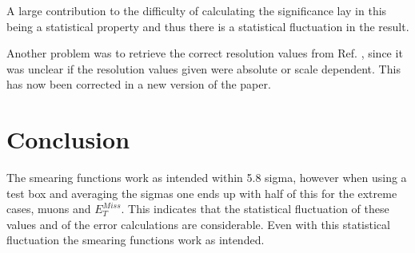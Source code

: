 A large contribution to the difficulty of calculating the significance lay in this being a statistical property and thus there is a statistical fluctuation in the result. 

Another problem was to retrieve the correct resolution values from Ref. \citep{ATL-PHYS-PUB-2013-004}, since it was unclear if the resolution values given were absolute or scale dependent. This has now been corrected in a new version of the paper.

\section{Conclusion}
The smearing functions work as intended within 5.8 sigma, however when using a test box and averaging the sigmas one ends up with half of this for the extreme cases, muons and $E_T^{Miss}$. This indicates that the statistical fluctuation of these values and of the error calculations are considerable. Even with this statistical fluctuation the smearing functions work as intended.